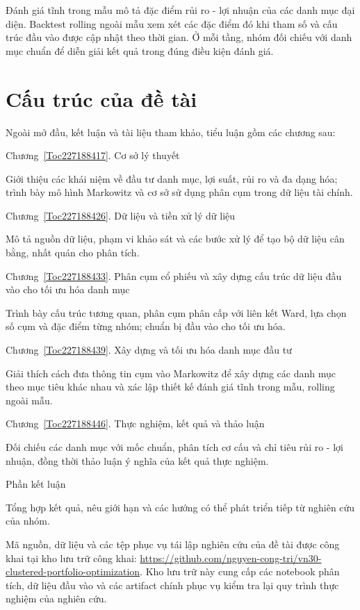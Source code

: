 \documentclass[12pt,a4paper,openany,oneside]{book}
\begin{document}
Đánh giá tĩnh trong mẫu mô tả đặc điểm rủi ro - lợi nhuận của các danh mục đại diện. Backtest rolling ngoài mẫu xem xét các đặc điểm đó khi tham số và cấu trúc đầu vào được cập nhật theo thời gian. Ở mỗi tầng, nhóm đối chiếu với danh mục chuẩn để diễn giải kết quả trong đúng điều kiện đánh giá.

\section{Cấu trúc của đề tài}\label{Toc227188416}
Ngoài mở đầu, kết luận và tài liệu tham khảo, tiểu luận gồm các chương sau:

Chương~\ref{Toc227188417}. Cơ sở lý thuyết

Giới thiệu các khái niệm về đầu tư danh mục, lợi suất, rủi ro và đa dạng hóa; trình bày mô hình Markowitz và cơ sở sử dụng phân cụm trong dữ liệu tài chính.

Chương~\ref{Toc227188426}. Dữ liệu và tiền xử lý dữ liệu

Mô tả nguồn dữ liệu, phạm vi khảo sát và các bước xử lý để tạo bộ dữ liệu cân bằng, nhất quán cho phân tích.

Chương~\ref{Toc227188433}. Phân cụm cổ phiếu và xây dựng cấu trúc dữ liệu đầu vào cho tối ưu hóa danh mục

Trình bày cấu trúc tương quan, phân cụm phân cấp với liên kết Ward, lựa chọn số cụm và đặc điểm từng nhóm; chuẩn bị đầu vào cho tối ưu hóa.

Chương~\ref{Toc227188439}. Xây dựng và tối ưu hóa danh mục đầu tư

Giải thích cách đưa thông tin cụm vào Markowitz để xây dựng các danh mục theo mục tiêu khác nhau và xác lập thiết kế đánh giá tĩnh trong mẫu, rolling ngoài mẫu.

Chương~\ref{Toc227188446}. Thực nghiệm, kết quả và thảo luận

Đối chiếu các danh mục với mốc chuẩn, phân tích cơ cấu và chỉ tiêu rủi ro - lợi nhuận, đồng thời thảo luận ý nghĩa của kết quả thực nghiệm.

Phần kết luận

Tổng hợp kết quả, nêu giới hạn và các hướng có thể phát triển tiếp từ nghiên cứu của nhóm.

Mã nguồn, dữ liệu và các tệp phục vụ tái lập nghiên cứu của đề tài được công khai tại kho lưu trữ công khai: \url{https://github.com/nguyen-cong-tri/vn30-clustered-portfolio-optimization}. Kho lưu trữ này cung cấp các notebook phân tích, dữ liệu đầu vào và các artifact chính phục vụ kiểm tra lại quy trình thực nghiệm của nghiên cứu.
\end{document}
